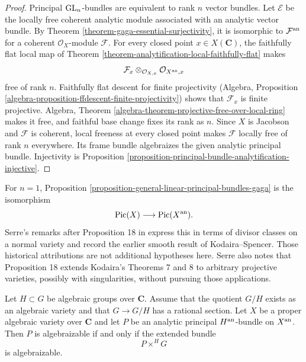 \begin{proof}
Principal $\mathop{\rm GL}_n$-bundles are equivalent to rank $n$ vector
bundles. Let $\mathcal E$ be the locally free coherent analytic module
associated with an analytic vector bundle. By Theorem
\ref{theorem-gaga-essential-surjectivity}, it is isomorphic to
$\mathcal F^{\rm an}$ for a coherent $\mathcal O_X$-module $\mathcal F$.
For every closed point $x\in X(\mathbf C)$, the faithfully flat local map
of Theorem \ref{theorem-analytification-local-faithfully-flat} makes
$$
\mathcal F_x\otimes_{\mathcal O_{X,x}}
\mathcal O_{X^{\rm an},x}
$$
free of rank $n$. Faithfully flat descent for finite projectivity (Algebra,
Proposition \ref{algebra-proposition-ffdescent-finite-projectivity}) shows
that $\mathcal F_x$ is finite projective. Algebra, Theorem
\ref{algebra-theorem-projective-free-over-local-ring} makes it free, and
faithful base change fixes its rank as $n$. Since $X$ is Jacobson and
$\mathcal F$ is coherent, local freeness at every closed point makes
$\mathcal F$ locally free of rank $n$ everywhere. Its frame bundle
algebraizes the given analytic principal bundle. Injectivity is Proposition
\ref{proposition-principal-bundle-analytification-injective}.
\end{proof}

\begin{remark}
\label{remark-line-bundles-gaga}
For $n=1$, Proposition
\ref{proposition-general-linear-principal-bundles-gaga} is the isomorphism
$$
\mathop{\rm Pic}(X)\longrightarrow\mathop{\rm Pic}(X^{\rm an}).
$$
Serre's remarks after Proposition 18 in \cite[\S 4, no. 20]{GAGA} express
this in terms of divisor classes on a normal variety and record the earlier
smooth result of Kodaira--Spencer. Those historical attributions are not
additional hypotheses here. Serre also notes that Proposition 18 extends
Kodaira's Theorems 7 and 8 to arbitrary projective varieties, possibly with
singularities, without pursuing those applications.
\end{remark}

\begin{proposition}
\label{proposition-algebraize-reduction-structure-group}
\begin{reference}
\cite[\S 4, no. 20, Proposition 19]{GAGA}
\end{reference}
Let $H\subset G$ be algebraic groups over $\mathbf C$. Assume that the
quotient $G/H$ exists as an algebraic variety and that
$G\to G/H$ has a rational section. Let $X$ be a proper algebraic variety
over $\mathbf C$ and let $P$ be an analytic principal $H^{\rm an}$-bundle
on $X^{\rm an}$. Then
$P$ is algebraizable if and only if the extended bundle
$$
P\times^H G
$$
is algebraizable.
\end{proposition}

